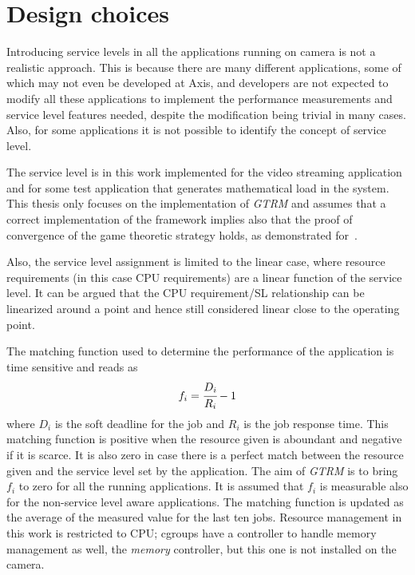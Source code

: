 \documentclass[nobiblatex]{LTHthesis}
\begin{document}
\section{Design choices}

Introducing service levels in all the applications running on camera
is not a realistic approach. This is because there are many different
applications, some of which may not even be developed at Axis, and 
developers are not expected to modify all these applications to implement 
the performance measurements and service level features needed, despite the
modification being trivial in many cases. Also, for some applications it is
not possible to identify the concept of service level. 

The service level is in this work implemented for the video streaming
application and for some test application that generates mathematical load
in the system. This thesis only focuses on the implementation of \emph{GTRM} and 
assumes that a correct implementation of the framework implies also that
the proof of convergence of the game theoretic strategy holds, as
demonstrated for~\cite{gtrm}.

Also, the service level assignment is limited to the linear case, where
resource requirements (in this case CPU requirements) are a linear function 
of the service level. It can be argued that the CPU requirement/SL
relationship can be linearized around a point and hence still considered
linear close to the operating point. 

The matching function used to determine the performance of the application is
time sensitive and reads as
\begin{equation}
f_{i}=\cfrac{D_{i}}{R_{i}}-1
\label{eq:matchingfunctiongeneral}
\end{equation}
where $D_{i}$ is the soft deadline for the job and $R_{i}$ is the job 
response time. This matching function is positive when the resource given is
aboundant and negative if it is scarce. It is also zero in case there
is a perfect match between the resource given and the service level set by
the application. The aim of \emph{GTRM} is to bring $f_i$ to zero for all the
running applications. It is assumed that $f_i$ is measurable also for the
non-service level aware applications. The matching function is updated as
the average of the measured value for the last ten jobs.
Resource management in this work is restricted to CPU; cgroups have a
controller to handle memory management as well, the \emph{memory} 
controller, but this one is not installed on the camera.
\end{document}
